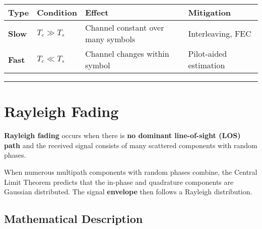 {\def\LTcaptype{} %
\begin{longtable}[]{@{}
  >{\raggedright\arraybackslash}p{}
  >{\raggedright\arraybackslash}p{}
  >{\raggedright\arraybackslash}p{}
  >{\raggedright\arraybackslash}p{}@{}}
\toprule\noalign{}
\begin{minipage}[b]{\linewidth}\raggedright
Type
\end{minipage} & \begin{minipage}[b]{\linewidth}\raggedright
Condition
\end{minipage} & \begin{minipage}[b]{\linewidth}\raggedright
Effect
\end{minipage} & \begin{minipage}[b]{\linewidth}\raggedright
Mitigation
\end{minipage} \\
\midrule\noalign{}
\endhead
\bottomrule\noalign{}
\endlastfoot
\textbf{Slow} & \(T_c \gg T_s\) & Channel constant over many symbols &
Interleaving, FEC \\
\textbf{Fast} & \(T_c \ll T_s\) & Channel changes within symbol &
Pilot-aided estimation \\
\end{longtable}
}

\begin{center}\rule{0.5\linewidth}{0.5pt}\end{center}

\section{Rayleigh Fading}

\textbf{Rayleigh fading} occurs when there is \textbf{no dominant line-of-sight (LOS) path} and the received signal consists of many scattered components with random phases.

\begin{keyconcept}
When numerous multipath components with random phases combine, the Central Limit Theorem predicts that the in-phase and quadrature components are Gaussian distributed. The signal \textbf{envelope} then follows a Rayleigh distribution.
\end{keyconcept}

\subsection{Mathematical Description}

